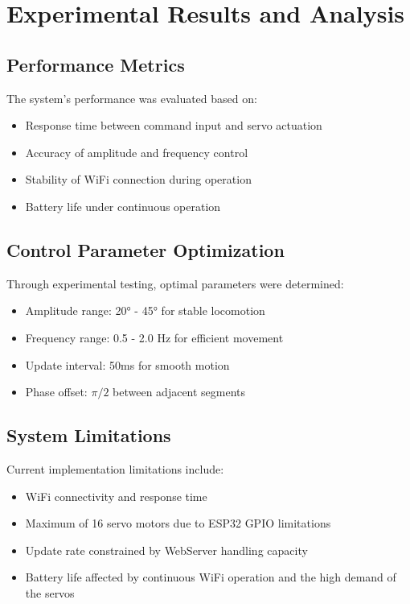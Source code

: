 \documentclass[12pt,a4paper]{report}
\begin{document}
\chapter{Experimental Results and Analysis}

\section{Performance Metrics}
The system's performance was evaluated based on:
\begin{itemize}
    \item Response time between command input and servo actuation
    \item Accuracy of amplitude and frequency control
    \item Stability of WiFi connection during operation
    \item Battery life under continuous operation
\end{itemize}

\section{Control Parameter Optimization}
Through experimental testing, optimal parameters were determined:
\begin{itemize}
    \item Amplitude range: 20° - 45° for stable locomotion
    \item Frequency range: 0.5 - 2.0 Hz for efficient movement
    \item Update interval: 50ms for smooth motion
    \item Phase offset: $\pi/2$ between adjacent segments
\end{itemize}

\section{System Limitations}
Current implementation limitations include:
\begin{itemize}
    \item WiFi connectivity and response time
    \item Maximum of 16 servo motors due to ESP32 GPIO limitations
    \item Update rate constrained by WebServer handling capacity
    \item Battery life affected by continuous WiFi operation and the high demand of the servos
\end{itemize}
\end{document}
